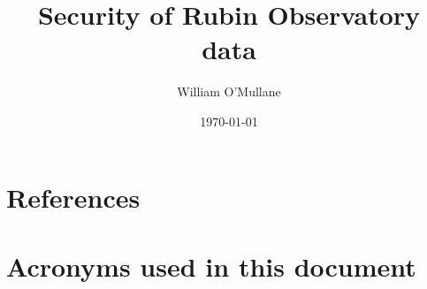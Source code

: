 \documentclass[DM,authoryear,toc]{lsstdoc}
\title{Security of Rubin Observatory data}
\author{%
William O'Mullane
}
\date{\today}
\begin{document}

\mkshorttitle




\appendix
\section{References} \label{sec:bib}
\renewcommand{\bibsection}{}


\section{Acronyms used in this document}\label{sec:acronyms}

\end{document}
